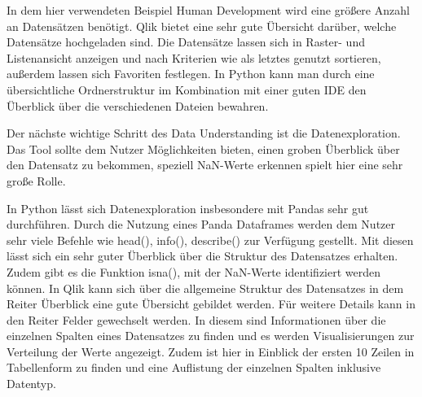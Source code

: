 \documentclass[12pt]{article}
\begin{document}
	In dem hier verwendeten Beispiel Human Development wird eine größere Anzahl an Datensätzen benötigt. Qlik bietet eine sehr gute Übersicht darüber, welche Datensätze hochgeladen sind. Die Datensätze lassen sich in Raster- und Listenansicht anzeigen und nach Kriterien wie als letztes genutzt sortieren, außerdem lassen sich Favoriten festlegen. In Python kann man durch eine übersichtliche Ordnerstruktur im Kombination mit einer guten IDE den Überblick über die verschiedenen Dateien bewahren.
	
	Der nächste wichtige Schritt des Data Understanding ist die Datenexploration. Das Tool sollte dem Nutzer Möglichkeiten bieten, einen groben Überblick über den Datensatz zu bekommen, speziell NaN-Werte erkennen spielt hier eine sehr große Rolle.
	
	In Python lässt sich Datenexploration insbesondere mit Pandas sehr gut durchführen. Durch die Nutzung eines Panda Dataframes werden dem Nutzer sehr viele Befehle wie head(), info(), describe() zur Verfügung gestellt. Mit diesen lässt sich ein sehr guter Überblick über die Struktur des Datensatzes erhalten. Zudem gibt es die Funktion isna(), mit der NaN-Werte identifiziert werden können.	
	In Qlik kann sich über die allgemeine Struktur des Datensatzes in dem Reiter Überblick eine gute Übersicht gebildet werden. Für weitere Details kann in den Reiter Felder gewechselt werden. In diesem sind Informationen über die einzelnen Spalten eines Datensatzes zu finden und es werden Visualisierungen zur Verteilung der Werte angezeigt. Zudem ist hier in Einblick der ersten 10 Zeilen in Tabellenform zu finden und eine Auflistung der einzelnen Spalten inklusive Datentyp.
	
\end{document}

